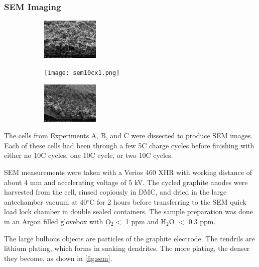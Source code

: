 \subsubsection{SEM Imaging}
\begin{figure}[h!]\label{fig:sem}
\centering
\caption{SEM images of cells after experiencing a few 5C cycles and either zero (left), one (center), or two (right) 10C cycles.}
     \begin{subfigure}
         \centering
         \includegraphics[width=0.3\textwidth]{sem5c.png}
     \end{subfigure}
     \hfill
     \begin{subfigure}
         \centering
         \texttt{[image: sem10cx1.png]}
     \end{subfigure}
     \hfill
     \begin{subfigure}
         \centering
         \includegraphics[width=0.3\textwidth]{sem10cx2.png}
     \end{subfigure}
\end{figure}

The cells from Experiments A, B, and C were dissected to produce SEM images. Each of these cells had been through a few 5C charge cycles before finishing with either no 10C cycles, one 10C cycle, or two 10C cycles. 

SEM measurements were taken with a Verios 460 XHR with working distance of about 4 mm and accelerating voltage of 5 kV. The cycled graphite anodes were harvested from the cell, rinsed copiously in DMC, and dried in the large antechamber vacuum at 40$^{\circ}$C for 2 hours before transferring to the SEM quick load lock chamber in double sealed containers. The sample preparation was done in an Argon filled glovebox with O$_2 <$ 1 ppm and H$_2$O $<$ 0.3 ppm.

The large bulbous objects are particles of the graphite electrode. The tendrils are lithium plating, which forms in snaking dendrites. 
The more plating, the denser they become, as shown in \hyperref[fig:sem]{\cref{fig:sem}}.  

